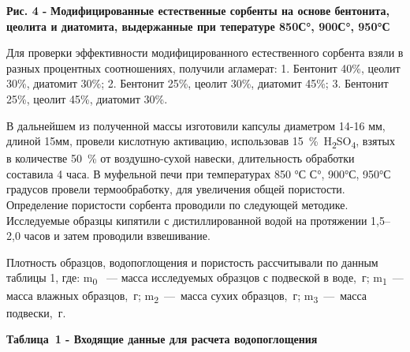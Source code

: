 {\bfseries Рис. 4 -} {\bfseries Модифицированные естественные сорбенты на
основе бентонита, цеолита и диатомита, выдержанные при тепературе 850С°,
900С°, 950°С}

Для проверки эффективности модифицированного естественного сорбента
взяли в разных процентных соотношениях, получили агламерат: 1. Бентонит
40\%, цеолит 30\%, диатомит 30\%; 2. Бентонит 25\%, цеолит 30\%,
диатомит 45\%; 3. Бентонит 25\%, цеолит 45\%, диатомит 30\%.

В дальнейшем из полученной массы изготовили капсулы диаметром 14-16 мм,
длиной 15мм, провели кислотную активацию, использовав
15~\%~H\textsubscript{2}SO\textsubscript{4}, взятых в количестве 50~\%
от воздушно-сухой навески, длительность обработки составила 4 часа. В
муфельной печи при температурах 850 °С С°, 900°С, 950°С градусов провели
термообработку, для увеличения общей пористости. Определение пористости
сорбента проводили по следующей методике. Исследуемые образцы кипятили с
дистиллированной водой на протяжении 1,5--2,0 часов и затем проводили
взвешивание.

Плотность образцов, водопоглощения и пористость рассчитывали по данным
таблицы 1, где: m\textsubscript{0} ~--- масса исследуемых образцов с
подвеской в воде,~г; m\textsubscript{1}~--- масса влажных образцов,~г;
m\textsubscript{2}~---~масса сухих образцов,~г;
m\textsubscript{3}~---~масса подвески,~г.

{\bfseries Таблица~1 - Входящие данные для расчета водопоглощения}

